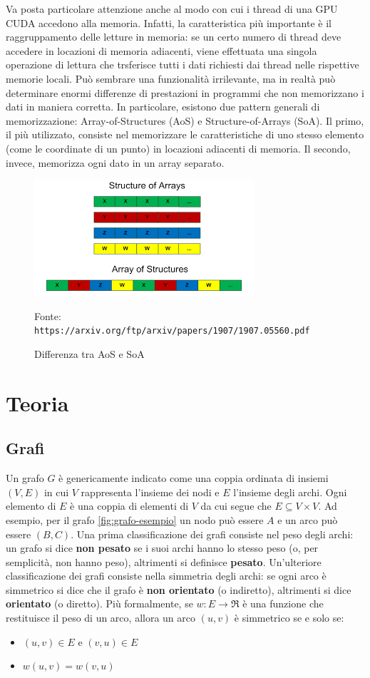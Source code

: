 \documentclass[12pt,a4paper]{book}
\newcommand{\source}[1]{\caption*{Fonte: {\small\texttt{#1}}} }
\begin{document}
	Va posta particolare attenzione anche al modo con cui i thread di una GPU CUDA accedono alla memoria. Infatti, la caratteristica più importante è il raggruppamento delle letture in memoria: se un certo numero di thread deve accedere in locazioni di memoria adiacenti, viene effettuata una singola operazione di lettura che trsferisce tutti i dati richiesti dai thread nelle rispettive memorie locali. Può sembrare una funzionalità irrilevante, ma in realtà può determinare enormi differenze di prestazioni in programmi che non memorizzano i dati in maniera corretta. In particolare, esistono due pattern generali di memorizzazione: Array-of-Structures (AoS) e Structure-of-Arrays (SoA). Il primo, il più utilizzato, consiste nel memorizzare le caratteristiche di uno stesso elemento (come le coordinate di un punto) in locazioni adiacenti di memoria. Il secondo, invece, memorizza ogni dato in un array separato.
	
	\begin{figure}[!ht]
		\centering
		\includegraphics[width=0.7\linewidth]{aos-vs-soa}
		\caption{Differenza tra AoS e SoA}
		\source{https://arxiv.org/ftp/arxiv/papers/1907/1907.05560.pdf}
		\label{fig:aos-vs-soa}
	\end{figure}
	
	
	\chapter{Teoria}
	\section{Grafi}
	Un grafo $G$ è genericamente indicato come una coppia ordinata di insiemi $(V,E)$ in cui $V$ rappresenta l'insieme dei nodi e $E$ l'insieme degli archi. Ogni elemento di $E$ è una coppia di elementi di $V$ da cui segue che $E \subseteq V \times V$. Ad esempio, per il grafo \ref{fig:grafo-esempio} un nodo può essere $A$ e un arco può essere $(B,C)$. Una prima classificazione dei grafi consiste nel peso degli archi: un grafo si dice \textbf{non pesato} se i suoi archi hanno lo stesso peso (o, per semplicità, non hanno peso), altrimenti si definisce \textbf{pesato}. Un'ulteriore classificazione dei grafi consiste nella simmetria degli archi: se ogni arco è simmetrico si dice che il grafo è \textbf{non orientato} (o indiretto), altrimenti si dice \textbf{orientato} (o diretto). Più formalmente, se $w:E \rightarrow \Re$ è una funzione che restituisce il peso di un arco, allora un arco $(u,v)$ è simmetrico se e solo se:
	\begin{itemize}
		\item $(u,v) \in E$ e $(v,u) \in E$
		\item $w(u,v) = w(v,u)$
	\end{itemize}
\end{document}
